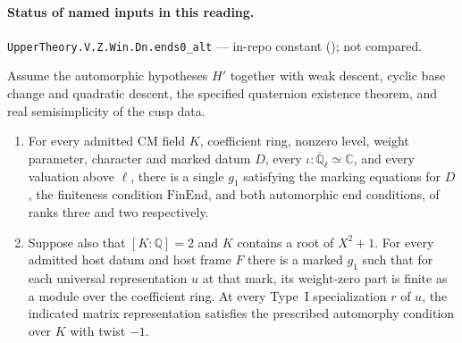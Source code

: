 

\paragraph{Status of named inputs in this reading.}
\noindent\nolinkurl{UpperTheory.V.Z.Win.Dn.ends0_alt} --- in-repo constant (); not compared.\par

\begin{formalstatement}\label{pn:P024}
Assume the automorphic hypotheses \(H'\) together with weak descent,
cyclic base change and quadratic descent, the specified quaternion
existence theorem, and real semisimplicity of the cusp data.
\begin{enumerate}
\item For every admitted CM field \(K\), coefficient ring, nonzero level,
weight parameter, character and marked datum \(D\), every
\(\iota:\overline{\mathbb Q}_\ell\simeq\mathbb C\), and every valuation
above \(\ell\), there is a single \(g_1\) satisfying the marking equations
for \(D\), the finiteness condition \(\mathrm{FinEnd}\), and both automorphic
end conditions, of ranks three and two respectively.
\item Suppose also that \([K:\mathbb Q]=2\) and \(K\) contains a root
of \(X^2+1\). For every admitted host datum and host frame \(F\) there
is a marked \(g_1\) such that for each universal representation \(u\)
at that mark, its weight-zero part is finite as a module over the
coefficient ring. At every Type~I specialization \(r\) of \(u\), the
indicated matrix representation satisfies the prescribed
automorphy condition over \(K\) with twist \(-1\).
\end{enumerate}
\end{formalstatement}

